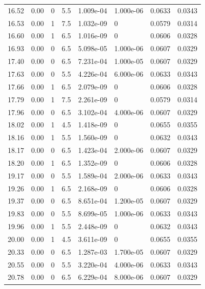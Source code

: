 \documentclass[preview]{standalone}
\begin{document}
{{{\begin{tabular}{L{1.2cm}C{1.2cm} C{0.3cm}C{0.5cm} C{1.4cm}C{1.4cm} C{1.4cm}C{1.4cm}}
  16.52  &  0.00  & 0     & 5.5 &  1.009e-04  & 1.000e-06  & 0.0633 &  0.0343   \\ 
  16.53  &  0.00  & 1     & 7.5 &  1.032e-09  & 0  & 0.0579 &  0.0314   \\ 
  16.60  &  0.00  & 1     & 6.5 &  1.016e-09  & 0  & 0.0606 &  0.0328   \\ 
  16.93  &  0.00  & 0     & 6.5 &  5.098e-05  & 1.000e-06  & 0.0607 &  0.0329   \\ 
  17.40  &  0.00  & 0     & 6.5 &  7.231e-04  & 1.000e-05  & 0.0607 &  0.0329   \\ 
  17.63  &  0.00  & 0     & 5.5 &  4.226e-04  & 6.000e-06  & 0.0633 &  0.0343   \\ 
  17.66  &  0.00  & 1     & 6.5 &  2.079e-09  & 0  & 0.0606 &  0.0328   \\ 
  17.79  &  0.00  & 1     & 7.5 &  2.261e-09  & 0  & 0.0579 &  0.0314   \\ 
  17.96  &  0.00  & 0     & 6.5 &  3.102e-04  & 4.000e-06  & 0.0607 &  0.0329   \\ 
  18.02  &  0.00  & 1     & 4.5 &  1.418e-09  & 0  & 0.0655 &  0.0355   \\ 
  18.16  &  0.00  & 1     & 5.5 &  1.560e-09  & 0  & 0.0632 &  0.0343   \\ 
  18.17  &  0.00  & 0     & 6.5 &  1.423e-04  & 2.000e-06  & 0.0607 &  0.0329   \\ 
  18.20  &  0.00  & 1     & 6.5 &  1.352e-09  & 0  & 0.0606 &  0.0328   \\ 
  19.17  &  0.00  & 0     & 5.5 &  1.589e-04  & 2.000e-06  & 0.0633 &  0.0343   \\ 
  19.26  &  0.00  & 1     & 6.5 &  2.168e-09  & 0  & 0.0606 &  0.0328   \\ 
  19.37  &  0.00  & 0     & 6.5 &  8.651e-04  & 1.200e-05  & 0.0607 &  0.0329   \\ 
  19.83  &  0.00  & 0     & 5.5 &  8.699e-05  & 1.000e-06  & 0.0633 &  0.0343   \\ 
  19.96  &  0.00  & 1     & 5.5 &  2.448e-09  & 0  & 0.0632 &  0.0343   \\ 
  20.00  &  0.00  & 1     & 4.5 &  3.611e-09  & 0  & 0.0655 &  0.0355   \\ 
  20.33  &  0.00  & 0     & 6.5 &  1.287e-03  & 1.700e-05  & 0.0607 &  0.0329   \\ 
  20.55  &  0.00  & 0     & 5.5 &  3.220e-04  & 4.000e-06  & 0.0633 &  0.0343   \\ 
  20.78  &  0.00  & 0     & 6.5 &  6.229e-04  & 8.000e-06  & 0.0607 &  0.0329   \\ 

\end{tabular}}}}
\end{document}
